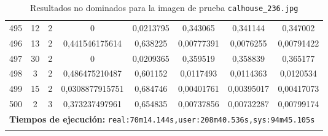 \begin{longtable}{|c|c|c|c|c|c|c|c|}
495 & 12 & 2 & 0 & 0,0213795 & 0,343065 & 0,341144 & 0,347002  \\
496 & 13 & 2 & 0,441546175614 & 0,638225 & 0,00777391 & 0,0076255 & 0,00791422  \\
497 & 30 & 2 & 0 & 0,0209365 & 0,359519 & 0,358839 & 0,365177  \\
498 & 3 & 2 & 0,486475210487 & 0,601152 & 0,0117493 & 0,0114363 & 0,0120534  \\
499 & 15 & 2 & 0,0308877915751 & 0,684746 & 0,00401761 & 0,00395017 & 0,00417073  \\
500 & 2 & 3 & 0,373237497961 & 0,654835 & 0,00737856 & 0,00732287 & 0,00799174  \\
\multicolumn{8}{|c|}{\textbf{Tiempos de ejecución:} \texttt{real:70m14.144s,user:208m40.536s,sys:94m45.105s
}}\\  \hline
\caption{Resultados no dominados para la imagen de prueba \texttt{calhouse\_236.jpg}}
\label{tab:calhouse_236}
\end{longtable}
\normalsize

